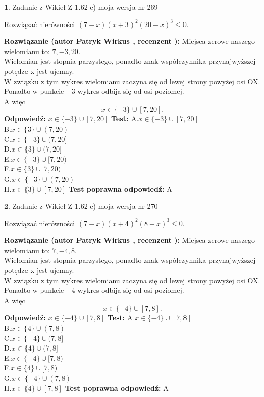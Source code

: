 \documentclass[12pt, a4paper]{article}
\theoremstyle{definition} %
\newtheorem{zad}{}
\newcommand{\zadStart}[1]{\begin{zad}#1\newline}
\newcommand{\zadStop}{\end{zad}}
\newcommand{\rozwStart}[2]{\noindent \textbf{Rozwiązanie (autor #1 , recenzent #2): }\newline}
\newcommand{\rozwStop}{\newline}
\newcommand{\odpStart}{\noindent \textbf{Odpowiedź:}\newline}
\newcommand{\odpStop}{\newline}
\newcommand{\testStart}{\noindent \textbf{Test:}\newline}
\newcommand{\testStop}{\newline}
\newcommand{\kluczStart}{\noindent \textbf{Test poprawna odpowiedź:}\newline}
\newcommand{\kluczStop}{\newline}
\begin{document}
\zadStart{Zadanie z Wikieł Z 1.62 c) moja wersja nr 269}

Rozwiązać nierówności $(7-x)(x+3)^{2}(20-x)^{3}\le0$.
\zadStop
\rozwStart{Patryk Wirkus}{}
Miejsca zerowe naszego wielomianu to: $7, -3, 20$.\\
Wielomian jest stopnia parzystego, ponadto znak współczynnika przy\linebreak najwyższej potędze x jest ujemny.\\ W związku z tym wykres wielomianu zaczyna się od lewej strony powyżej osi OX.\\
Ponadto w punkcie $-3$ wykres odbija się od osi poziomej.\\
A więc $$x \in \{-3\} \cup [7,20].$$
\rozwStop
\odpStart
$x \in \{-3\} \cup [7,20]$
\odpStop
\testStart
A.$x \in \{-3\} \cup [7,20]$\\
B.$x \in \{3\} \cup (7,20)$\\
C.$x \in \{-3\} \cup (7,20]$\\
D.$x \in \{3\} \cup (7,20]$\\
E.$x \in \{-3\} \cup [7,20)$\\
F.$x \in \{3\} \cup [7,20)$\\
G.$x \in \{-3\} \cup (7,20)$\\
H.$x \in \{3\} \cup [7,20]$
\testStop
\kluczStart
A
\kluczStop



\zadStart{Zadanie z Wikieł Z 1.62 c) moja wersja nr 270}

Rozwiązać nierówności $(7-x)(x+4)^{2}(8-x)^{3}\le0$.
\zadStop
\rozwStart{Patryk Wirkus}{}
Miejsca zerowe naszego wielomianu to: $7, -4, 8$.\\
Wielomian jest stopnia parzystego, ponadto znak współczynnika przy\linebreak najwyższej potędze x jest ujemny.\\ W związku z tym wykres wielomianu zaczyna się od lewej strony powyżej osi OX.\\
Ponadto w punkcie $-4$ wykres odbija się od osi poziomej.\\
A więc $$x \in \{-4\} \cup [7,8].$$
\rozwStop
\odpStart
$x \in \{-4\} \cup [7,8]$
\odpStop
\testStart
A.$x \in \{-4\} \cup [7,8]$\\
B.$x \in \{4\} \cup (7,8)$\\
C.$x \in \{-4\} \cup (7,8]$\\
D.$x \in \{4\} \cup (7,8]$\\
E.$x \in \{-4\} \cup [7,8)$\\
F.$x \in \{4\} \cup [7,8)$\\
G.$x \in \{-4\} \cup (7,8)$\\
H.$x \in \{4\} \cup [7,8]$
\testStop
\kluczStart
A
\kluczStop
\end{document}

